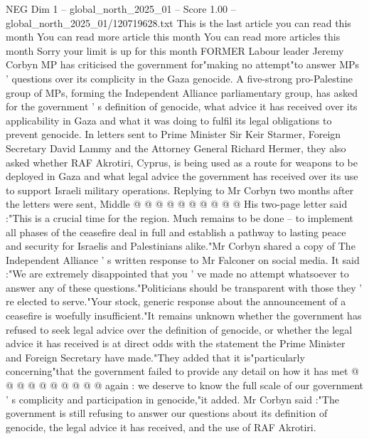 \begin{textsample}{NEG Dim 1 – global\_north\_2025\_01 – Score 1.00 – global\_north\_2025\_01/120719628.txt}  \label{ex:f1_neg_064}
This is the last article you can read this month You can read more article this month You can read more articles this month Sorry your limit is up for this month FORMER Labour leader Jeremy Corbyn MP has criticised the government for"making no attempt"to answer MPs ' questions over its complicity in the Gaza genocide.
A five-strong pro-Palestine group of MPs, forming the Independent Alliance parliamentary group, has asked for the government ' s definition of genocide, what advice it has received over its applicability in Gaza and what it was doing to fulfil its legal obligations to prevent genocide.
In letters sent to Prime Minister Sir Keir Starmer, Foreign Secretary David Lammy and the Attorney General Richard Hermer, they also asked whether RAF Akrotiri, Cyprus, is being used as a route for weapons to be deployed in Gaza and what legal advice the government has received over its use to support Israeli military operations.
Replying to Mr Corbyn two months after the letters were sent, Middle @ @ @ @ @ @ @ @ @ @ His two-page letter said :"This is a crucial time for the region.
Much remains to be done -- to implement all phases of the ceasefire deal in full and establish a pathway to lasting peace and security for Israelis and Palestinians alike."Mr Corbyn shared a copy of The Independent Alliance ' s written response to Mr Falconer on social media.
It said :"We are extremely disappointed that you ' ve made no attempt whatsoever to answer any of these questions."Politicians should be transparent with those they ' re elected to serve."Your stock, generic response about the announcement of a ceasefire is woefully insufficient."It remains unknown whether the government has refused to seek legal advice over the definition of genocide, or whether the legal advice it has received is at direct odds with the statement the Prime Minister and Foreign Secretary have made."They added that it is"particularly concerning"that the government failed to provide any detail on how it has met @ @ @ @ @ @ @ @ @ @ again : we deserve to know the full scale of our government ' s complicity and participation in genocide,"it added.
Mr Corbyn said :"The government is still refusing to answer our questions about its definition of genocide, the legal advice it has received, and the use of RAF Akrotiri.

\end{textsample}
